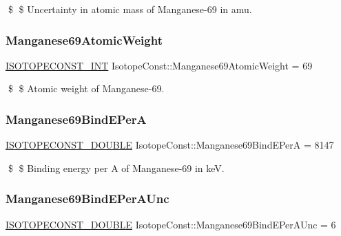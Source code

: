 \$ \$ Uncertainty in atomic mass of Manganese-\/69 in amu. \mbox{\label{group___isotope_const-_manganese-_mn69_ga0e0b094f9989e927014d5a8aac2c3eee}} 
\subsubsection{\texorpdfstring{Manganese69\+Atomic\+Weight}{Manganese69AtomicWeight}}
{\footnotesize\ttfamily \mbox{\hyperlink{group___isotope_const-_macros_ga5f18360b3e99483a35c32d789e62621c}{I\+S\+O\+T\+O\+P\+E\+C\+O\+N\+S\+T\+\_\+\+I\+NT}} Isotope\+Const\+::\+Manganese69\+Atomic\+Weight = 69}

\$ \$ Atomic weight of Manganese-\/69. \mbox{\label{group___isotope_const-_manganese-_mn69_ga6d4299a7dd7b284b16ac3cb52a43e964}} 
\subsubsection{\texorpdfstring{Manganese69\+Bind\+E\+PerA}{Manganese69BindEPerA}}
{\footnotesize\ttfamily \mbox{\hyperlink{group___isotope_const-_macros_ga8f45a7272ce02c0b4c65c44636ed719a}{I\+S\+O\+T\+O\+P\+E\+C\+O\+N\+S\+T\+\_\+\+D\+O\+U\+B\+LE}} Isotope\+Const\+::\+Manganese69\+Bind\+E\+PerA = 8147}

\$ \$ Binding energy per A of Manganese-\/69 in keV. \mbox{\label{group___isotope_const-_manganese-_mn69_gab5309d27069d08cbe31bd6f7e54cc20e}} 
\subsubsection{\texorpdfstring{Manganese69\+Bind\+E\+Per\+A\+Unc}{Manganese69BindEPerAUnc}}
{\footnotesize\ttfamily \mbox{\hyperlink{group___isotope_const-_macros_ga8f45a7272ce02c0b4c65c44636ed719a}{I\+S\+O\+T\+O\+P\+E\+C\+O\+N\+S\+T\+\_\+\+D\+O\+U\+B\+LE}} Isotope\+Const\+::\+Manganese69\+Bind\+E\+Per\+A\+Unc = 6}

